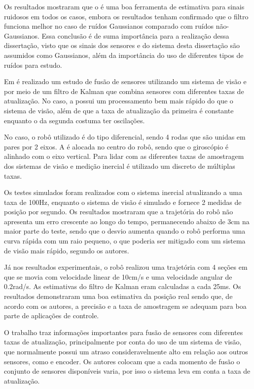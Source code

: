 \documentclass[acronym, symbols, table, deposito]{fei}
\begin{document}
Os resultados mostraram que o  é uma boa ferramenta de estimativa para sinais ruidosos em todos os casos, embora os resultados tenham confirmado que o filtro funciona melhor no caso de ruídos Gaussianos comparado com ruídos não-Gaussianos. Essa conclusão é de suma importância para a realização dessa dissertação, visto que os sinais dos sensores e do sistema desta dissertação são assumidos como Gaussianos, além da importância do uso de diferentes tipos de ruídos para estudo.


Em \textcite{10.1007/978-3-642-54734-8_23} é realizado um estudo de fusão de sensores utilizando um sistema de visão e  por meio de um filtro de Kalman que combina sensores com diferentes taxas de atualização. No caso, a  possui um processamento bem mais rápido do que o sistema de visão, além de que a taxa de atualização da primeira é constante enquanto o da segunda costuma ter oscilações.

No caso, o robô utilizado é do tipo diferencial, sendo 4 rodas que são unidas em pares por 2 eixos. A  é alocada no centro do robô, sendo que o giroscópio é alinhado com o eixo vertical. Para lidar com as diferentes taxas de amostragem dos sistemas de visão e medição inercial é utilizado um  discreto de múltiplas taxas.

Os testes simulados foram realizados com o sistema inercial atualizando a uma taxa de 100Hz, enquanto o sistema de visão é simulado e fornece 2 medidas de posição por segundo. Os resultados mostraram que a trajetória do robô não apresenta um erro crescente ao longo do tempo, permanecendo abaixo de 3cm na maior parte do teste, sendo que o desvio aumenta quando o robô performa uma curva rápida com um raio pequeno, o que poderia ser mitigado com um sistema de visão mais rápido, segundo os autores.

Já nos resultados experimentais, o robô realizou uma trajetória com 4 seções em que se movia com velocidade linear de 10cm/s e uma velocidade angular de 0.2rad/s. As estimativas do filtro de Kalman eram calculadas a cada 25ms. Os resultados demonstraram uma boa estimativa da posição real sendo que, de acordo com os autores, a precisão e a taxa de amostragem se adequam para boa parte de aplicações de controle.

O trabalho traz informações importantes para fusão de sensores com diferentes taxas de atualização, principalmente por conta do uso de um sistema de visão, que normalmente possui um atraso consideravelmente alto em relação aos outros sensores, como  e encoder. Os autores colocam que a cada momento de fusão o conjunto de sensores disponíveis varia, por isso o sistema leva em conta a taxa de atualização.
\end{document}
